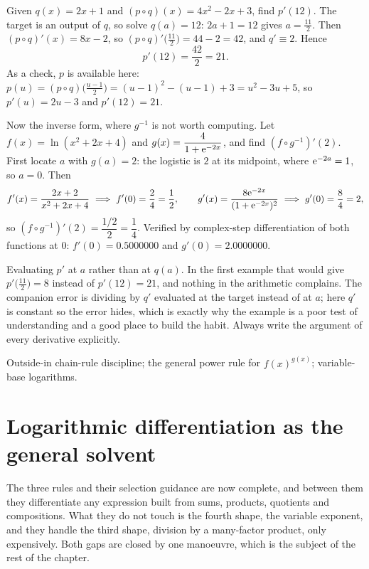\begin{worked}
Given $q(x)=2x+1$ and $(p\circ q)(x)=4x^{2}-2x+3$, find $p'(12)$. The target is an output of $q$, so solve $q(a)=12$: $2a+1=12$ gives $a=\tfrac{11}{2}$. Then $(p\circ q)'(x)=8x-2$, so $(p\circ q)'\bigl(\tfrac{11}{2}\bigr)=44-2=42$, and $q'\equiv2$. Hence
\[
p'(12)=\frac{42}{2}=21 .
\]
As a check, $p$ is available here: $p(u)=(p\circ q)\bigl(\tfrac{u-1}{2}\bigr)=(u-1)^{2}-(u-1)+3=u^{2}-3u+5$, so $p'(u)=2u-3$ and $p'(12)=21$.

Now the inverse form, where $g^{-1}$ is not worth computing. Let $f(x)=\ln(x^{2}+2x+4)$ and $g(x)=\dfrac{4}{1+\mathrm{e}^{-2x}}$, and find $(f\circ g^{-1})'(2)$. First locate $a$ with $g(a)=2$: the logistic is $2$ at its midpoint, where $\mathrm{e}^{-2a}=1$, so $a=0$. Then
\[
f'(x)=\frac{2x+2}{x^{2}+2x+4}\ \Longrightarrow\ f'(0)=\frac24=\frac12,\qquad
g'(x)=\frac{8\eu^{-2x}}{(1+\eu^{-2x})^{2}}\ \Longrightarrow\ g'(0)=\frac84=2,
\]
so $(f\circ g^{-1})'(2)=\dfrac{1/2}{2}=\dfrac14$. Verified by complex-step differentiation of both functions at $0$: $f'(0)=0.5000000$ and $g'(0)=2.0000000$.
\end{worked}

\begin{trap}
Evaluating $p'$ at $a$ rather than at $q(a)$. In the first example that would give $p'\bigl(\tfrac{11}{2}\bigr)=8$ instead of $p'(12)=21$, and nothing in the arithmetic complains. The companion error is dividing by $q'$ evaluated at the target instead of at $a$; here $q'$ is constant so the error hides, which is exactly why the example is a poor test of understanding and a good place to build the habit. Always write the argument of every derivative explicitly.
\end{trap}

\begin{seealsob}Outside-in chain-rule discipline; the general power rule for $f(x)^{g(x)}$; variable-base logarithms.\end{seealsob}

\section{Logarithmic differentiation as the general solvent}

The three rules and their selection guidance are now complete, and between them they differentiate any expression built from sums, products, quotients and compositions. What they do not touch is the fourth shape, the variable exponent, and they handle the third shape, division by a many-factor product, only expensively. Both gaps are closed by one manoeuvre, which is the subject of the rest of the chapter.

